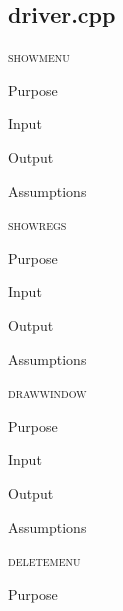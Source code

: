 \documentclass[pdftex, 11pt]{article}
\begin{document}
\subsection{driver.cpp}

\begin{description}

	\item{\textsc{showmenu}}

		\begin{description}
			\item{Purpose}


			\item{Input}


			\item{Output}


			\item{Assumptions}


		\end{description}


	\item{\textsc{showregs}}

		\begin{description}
			\item{Purpose}


			\item{Input}


			\item{Output}


			\item{Assumptions}


		\end{description}


	\item{\textsc{drawwindow}}

		\begin{description}
			\item{Purpose}


			\item{Input}


			\item{Output}


			\item{Assumptions}


		\end{description}


	\item{\textsc{deletemenu}}

		\begin{description}
			\item{Purpose}



\end{description}
\end{description}
\end{document}
